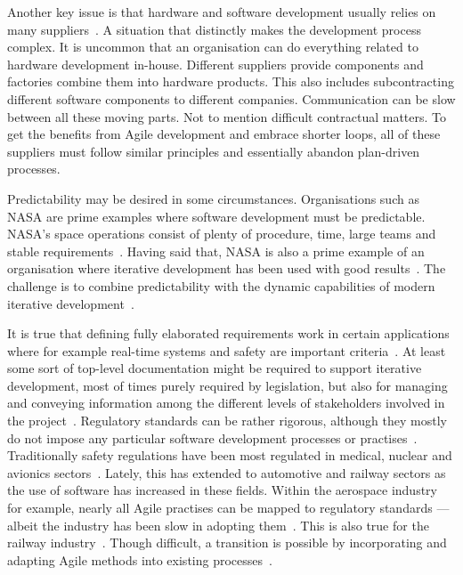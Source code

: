 \documentclass[english]{tktltiki2}
\begin{document}
Another key issue is that hardware and software development usually relies on many suppliers~\cite{EB12, HAB12, EHS14}. A situation that distinctly makes the development process complex. It is uncommon that an organisation can do everything related to hardware development in-house. Different suppliers provide components and factories combine them into hardware products. This also includes subcontracting different software components to different companies. Communication can be slow between all these moving parts. Not to mention difficult contractual matters. To get the benefits from Agile development and embrace shorter loops, all of these suppliers must follow similar principles and essentially abandon plan-driven processes.

Predictability may be desired in some circumstances. Organisations such as NASA are prime examples where software development must be predictable. NASA’s space operations consist of plenty of procedure, time, large teams and stable requirements~\cite{Fow05}. Having said that, NASA is also a prime example of an organisation where iterative development has been used with good results~\cite{LB03}. The challenge is to combine predictability with the dynamic capabilities of modern iterative development~\cite{EHS14}.

It is true that defining fully elaborated requirements work in certain applications where for example real-time systems and safety are important criteria~\cite{Boe88, KRM13}. At least some sort of top-level documentation might be required to support iterative development, most of times purely required by legislation, but also for managing and conveying information among the different levels of stakeholders involved in the project~\cite{KRM13, EHS14}. Regulatory standards can be rather rigorous, although they mostly do not impose any particular software development processes or practises~\cite{CWR10}. Traditionally safety regulations have been most regulated in medical, nuclear and avionics sectors~\cite{JLP12}. Lately, this has extended to automotive and railway sectors as the use of software has increased in these fields. Within the aerospace industry for example, nearly all Agile practises can be mapped to regulatory standards — albeit the industry has been slow in adopting them~\cite{VB09, CWR10}. This is also true for the railway industry~\cite{JLP12}. Though difficult, a transition is possible by incorporating and adapting Agile methods into existing processes~\cite{VB09}.
\end{document}
